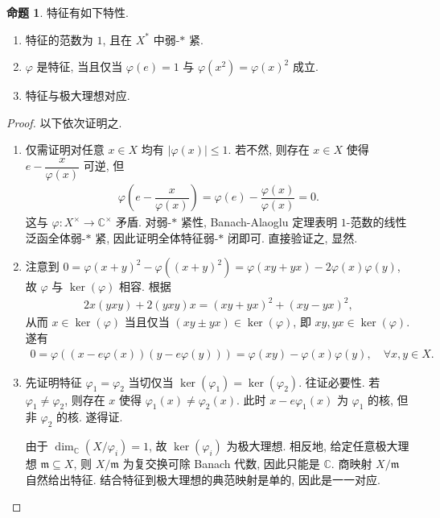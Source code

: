 \documentclass{MainStyle}
\theoremstyle{definition}
\theoremstyle{definition}
\theoremstyle{definition}
\theoremstyle{definition}
\newtheorem{proposition}{命题}
\theoremstyle{definition}
\theoremstyle{definition}
\theoremstyle{definition}
\theoremstyle{remark}
\theoremstyle{remark}
\begin{document}
\begin{proposition}\label{max-ideal}
    特征有如下特性.
    \begin{enumerate}
        \item 特征的范数为 $1$, 且在
              $X^\ast$ 中弱-$\ast$ 紧.
        \item $\varphi$ 是特征, 当且仅当 $\varphi(e)=1$ 与 $\varphi (x^2)=\varphi (x)^2$ 成立.
        \item 特征与极大理想对应.
    \end{enumerate}
    \begin{proof}
        以下依次证明之.
        \begin{enumerate}
            \item 仅需证明对任意 $x\in X$ 均有 $|\varphi (x)|\leq 1$. 若不然, 则存在 $x\in X$ 使得 $e-\dfrac{x}{\varphi(x)}$ 可逆, 但
                  \begin{align*}
                      \varphi \left(e-\dfrac{x}{\varphi(x)}\right)=\varphi (e)-\dfrac{\varphi(x)}{\varphi(x)}=0.
                  \end{align*}
                  这与 $\varphi:X^\times \to \mathbb C^\times $ 矛盾. 对弱-$\ast$ 紧性, Banach-Alaoglu 定理表明 $1$-范数的线性泛函全体弱-$\ast$ 紧, 因此证明全体特征弱-$\ast$ 闭即可. 直接验证之, 显然.
            \item 注意到 $0=\varphi (x+y)^2-\varphi ((x+y)^2)=\varphi (xy+yx)-2\varphi (x)\varphi (y)$, 故 $\varphi$ 与 $\ker(\varphi)$ 相容. 根据
                  \begin{align*}
                      2x(yxy)+2(yxy)x=(xy+yx)^2+(xy-yx)^2,
                  \end{align*}
                  从而 $x\in \ker(\varphi)$ 当且仅当 $(xy\pm yx)\in \ker(\varphi )$, 即 $xy,yx\in \ker(\varphi)$. 遂有
                  \begin{align*}
                      0=\varphi ((x-e\varphi (x))(y-e\varphi (y)))=\varphi(xy)-\varphi (x)\varphi(y),\quad \forall x,y\in X.
                  \end{align*}
            \item 先证明特征 $\varphi _1=\varphi_2$ 当切仅当 $\ker(\varphi_1)=\ker(\varphi_2)$. 往证必要性. 若 $\varphi_1\neq \varphi_2$, 则存在 $x$ 使得 $\varphi_1(x)\neq \varphi_2(x)$. 此时 $x-e\varphi _1(x)$ 为 $\varphi_1$ 的核, 但非 $\varphi_2$ 的核. 遂得证. \par
                  由于 $\dim_{\mathbb C}(X/\varphi_i)=1$, 故 $\ker(\varphi_i)$ 为极大理想. 相反地, 给定任意极大理想 $\mathfrak m\subseteq X$, 则 $X/\mathfrak m$ 为复交换可除 Banach 代数, 因此只能是 $\mathbb C$. 商映射 $X/\mathfrak m$ 自然给出特征. 结合特征到极大理想的典范映射是单的, 因此是一一对应.
        \end{enumerate}
    \end{proof}
\end{proposition}
\end{document}
